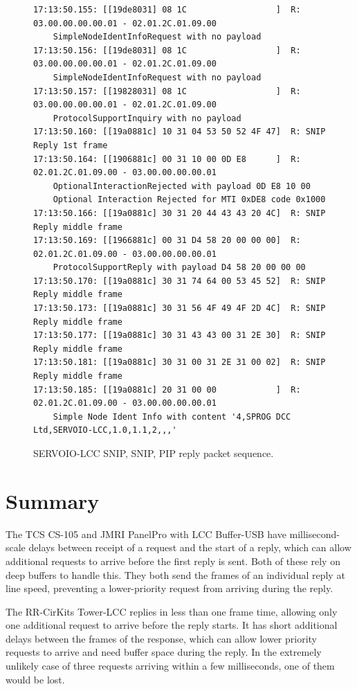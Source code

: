 \documentclass[11pt]{article}
\begin{document}
\begin{figure}[!htbp]
\begin{verbatim}
17:13:50.155: [[19de8031] 08 1C                  ]  R: 03.00.00.00.00.01 - 02.01.2C.01.09.00 
    SimpleNodeIdentInfoRequest with no payload
17:13:50.156: [[19de8031] 08 1C                  ]  R: 03.00.00.00.00.01 - 02.01.2C.01.09.00 
    SimpleNodeIdentInfoRequest with no payload
17:13:50.157: [[19828031] 08 1C                  ]  R: 03.00.00.00.00.01 - 02.01.2C.01.09.00 
    ProtocolSupportInquiry with no payload
17:13:50.160: [[19a0881c] 10 31 04 53 50 52 4F 47]  R: SNIP Reply 1st frame
17:13:50.164: [[1906881c] 00 31 10 00 0D E8      ]  R: 02.01.2C.01.09.00 - 03.00.00.00.00.01 
    OptionalInteractionRejected with payload 0D E8 10 00 
    Optional Interaction Rejected for MTI 0xDE8 code 0x1000
17:13:50.166: [[19a0881c] 30 31 20 44 43 43 20 4C]  R: SNIP Reply middle frame
17:13:50.169: [[1966881c] 00 31 D4 58 20 00 00 00]  R: 02.01.2C.01.09.00 - 03.00.00.00.00.01 
    ProtocolSupportReply with payload D4 58 20 00 00 00
17:13:50.170: [[19a0881c] 30 31 74 64 00 53 45 52]  R: SNIP Reply middle frame
17:13:50.173: [[19a0881c] 30 31 56 4F 49 4F 2D 4C]  R: SNIP Reply middle frame
17:13:50.177: [[19a0881c] 30 31 43 43 00 31 2E 30]  R: SNIP Reply middle frame
17:13:50.181: [[19a0881c] 30 31 00 31 2E 31 00 02]  R: SNIP Reply middle frame
17:13:50.185: [[19a0881c] 20 31 00 00            ]  R: 02.01.2C.01.09.00 - 03.00.00.00.00.01 
    Simple Node Ident Info with content '4,SPROG DCC Ltd,SERVOIO-LCC,1.0,1.1,2,,,'
\end{verbatim}
\caption{SERVOIO-LCC SNIP, SNIP, PIP reply packet sequence.}
\label{fig:SERVOIO_SNIP2PIP_reply_sequence}
\end{figure}

\clearpage

\section{Summary}

The TCS CS-105 and JMRI PanelPro with LCC Buffer-USB have millisecond-scale delays between receipt
of a request and the start of a reply, which can allow additional requests to arrive
before the first reply is sent.  
Both of these rely on deep buffers to handle this.
They both send the frames of an individual reply
at line speed, preventing a lower-priority request from arriving during the reply.

The RR-CirKits Tower-LCC replies in less than one frame time, allowing only one additional
request to arrive before the reply starts.  It has short additional delays
between the frames of the response, which can allow lower priority
requests to arrive and need buffer space during the reply.  
In the extremely unlikely case of three requests arriving within a few milliseconds, one
of them would be lost.
\end{document}
